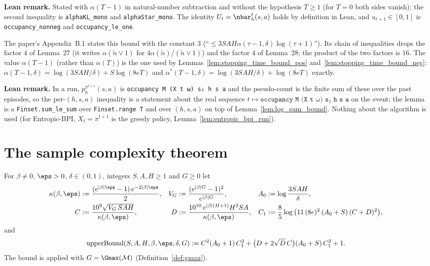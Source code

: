 \textbf{Lean remark.} Stated with $\alpha(T - 1)$ in natural-number subtraction and without the
hypothesis $T \ge 1$ (for $T = 0$ both sides vanish); the second inequality is \texttt{alphaKL\_mono}
and \texttt{alphaStar\_mono}. The identity $U_t = \nbar_h^t(s,a)$ holds by definition in Lean, and
$u_{t+1} \in [0,1]$ is \texttt{occupancy\_nonneg} and \texttt{occupancy\_le\_one}.

\begin{remark}\label{rem:sc_counting_constant}
The paper's Appendix~B.1 states this bound with the constant $3$ (``$\le 3SAH\alpha(\tau-1,\delta)\log(\tau+1)$'').
Its chain of inequalities drops the factor $4$ of Lemma~27 (it writes
$\alpha(\tilde n \vee 1)$ for $4\alpha(\tilde n)/(\tilde n \vee 1)$) and the factor $4$ of
Lemma~28; the product of the two factors is $16$. The value $\alpha(T-1)$ (rather than
$\alpha(T)$) is the one used by Lemmas~\ref{lem:stopping_time_bound_pos}
and~\ref{lem:stopping_time_bound_neg}: $\alpha(T-1,\delta) = \log(3SAH/\delta) + S\log(8eT)$
and $\alpha^*(T-1,\delta) = \log(3SAH/\delta) + \log(8eT)$ exactly.
\end{remark}

\textbf{Lean remark.} In a run, $p^{\pi^{t+1}}_h(s,a)$ is \texttt{occupancy M (X t ω) s₁ h s a}
and the pseudo-count is the finite sum of these over the past episodes, so the per-$(h,s,a)$
inequality is a statement about the real sequence $t \mapsto \texttt{occupancy M (X t ω) s₁ h s a}$
on the event; the lemma is a \texttt{Finset.sum\_le\_sum} over \texttt{Finset.range T} and over
$(h, s, a)$ on top of Lemma~\ref{lem:log_sum_bound}. Nothing about the algorithm is used
(for Entropic-BPI, $X_t = \pi^{t+1}$ is the greedy policy, Lemma~\ref{lem:entropic_bpi_run}).

\section{The sample complexity theorem}
\label{sec:sc_theorem}

\begin{definition}\label{def:upper_bound_const}
\leanok
{}
For $\beta \ne 0$, $\eps > 0$, $\delta \in (0,1)$, integers $S, A, H \ge 1$ and $G \ge 0$ let
\begin{align*}
  \kappa(\beta,\eps) &:= \frac{(e^{|\beta|\eps} - 1)\,e^{-2|\beta|\eps}}{2}, &
  V_G &:= \frac{(e^{|\beta| G} - 1)^2}{e^{|\beta| G}}, &
  A_0 &:= \log\frac{3SAH}{\delta}, \\
  C &:= \frac{10^9\sqrt{V_G\, S A H}}{\kappa(\beta,\eps)}, &
  D &:= \frac{10^{10}\, e^{|\beta|(H+1)} H^2 S A}{\kappa(\beta,\eps)}, &
  C_1 &:= \frac85\log\big(11\,(8e)^2\,(A_0 + S)\,(C + D)^2\big),
\end{align*}
and
\[
  \mathrm{upperBound}(S, A, H, \beta, \eps, \delta, G) := C^2 (A_0 + 1)\, C_1^2 + \big(D + 2\sqrt{D}\, C\big)(A_0 + S)\, C_1^2 + 1 .
\]
The bound is applied with $G = \Gmax(\mathcal M)$ (Definition~\ref{def:gmax}).
\end{definition}

